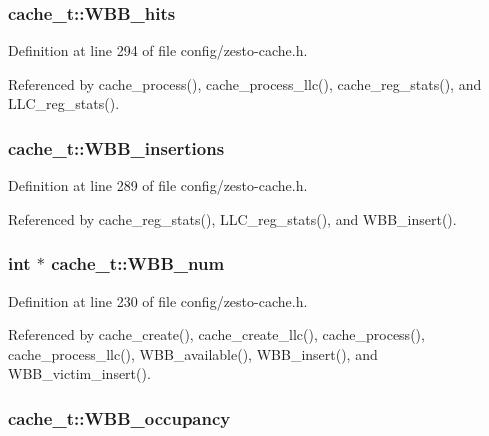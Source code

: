 \subsubsection[{WBB\_\-hits}]{ {\bf cache\_\-t::WBB\_\-hits}}\label{structcache__t_b676ee4fa653083eb09c37a3feab576e}




Definition at line 294 of file config/zesto-cache.h.

Referenced by cache\_\-process(), cache\_\-process\_\-llc(), cache\_\-reg\_\-stats(), and LLC\_\-reg\_\-stats().
\subsubsection[{WBB\_\-insertions}]{ {\bf cache\_\-t::WBB\_\-insertions}}\label{structcache__t_af89cd6ff80f5e2aee23f8cb3b1ef030}




Definition at line 289 of file config/zesto-cache.h.

Referenced by cache\_\-reg\_\-stats(), LLC\_\-reg\_\-stats(), and WBB\_\-insert().
\subsubsection[{WBB\_\-num}]{\setlength{\rightskip}{0pt plus 5cm}int $\ast$ {\bf cache\_\-t::WBB\_\-num}}\label{structcache__t_04107a5e149073f1e6d38da0137685b3}




Definition at line 230 of file config/zesto-cache.h.

Referenced by cache\_\-create(), cache\_\-create\_\-llc(), cache\_\-process(), cache\_\-process\_\-llc(), WBB\_\-available(), WBB\_\-insert(), and WBB\_\-victim\_\-insert().
\subsubsection[{WBB\_\-occupancy}]{ {\bf cache\_\-t::WBB\_\-occupancy}}\label{structcache__t_5cf4b90ecf6c273ccd80ab179c6e97eb}




